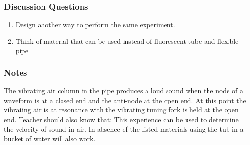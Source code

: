 \subsubsection*{Discussion Questions}
\begin{enumerate}
\item{Design another way to perform the same experiment.} 
\item{Think of material that can be used instead of fluorescent tube and flexible pipe}
\end{enumerate}

\subsubsection*{Notes}
The vibrating air column in the pipe produces a loud sound when the node of a waveform is at a closed end and the anti-node at the open end. At this point the vibrating air is at resonance with the vibrating tuning fork is held at the open end. 
Teacher should also know that: 
This experience can be used to determine the velocity of sound in air. In absence of the listed materials using the tub in a bucket of water will also work. 
	
	


